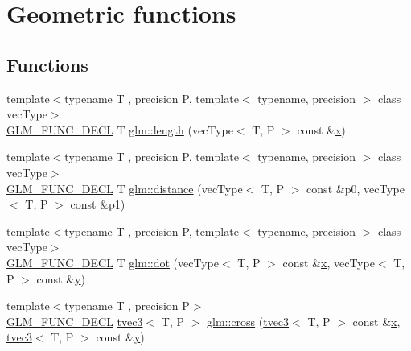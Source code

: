 \hypertarget{group__core__func__geometric}{}\section{Geometric functions}
\label{group__core__func__geometric}
\subsection*{Functions}
\begin{DoxyCompactItemize}
\item 
{\footnotesize template$<$typename T , precision P, template$<$ typename, precision $>$ class vec\+Type$>$ }\\\mbox{\hyperlink{setup_8hpp_ab2d052de21a70539923e9bcbf6e83a51}{G\+L\+M\+\_\+\+F\+U\+N\+C\+\_\+\+D\+E\+CL}} T \mbox{\hyperlink{group__core__func__geometric_ga18d45e3d4c7705e67ccfabd99e521604}{glm\+::length}} (vec\+Type$<$ T, P $>$ const \&\mbox{\hyperlink{glad_8h_a92d0386e5c19fb81ea88c9f99644ab1d}{x}})
\item 
{\footnotesize template$<$typename T , precision P, template$<$ typename, precision $>$ class vec\+Type$>$ }\\\mbox{\hyperlink{setup_8hpp_ab2d052de21a70539923e9bcbf6e83a51}{G\+L\+M\+\_\+\+F\+U\+N\+C\+\_\+\+D\+E\+CL}} T \mbox{\hyperlink{group__core__func__geometric_ga7ca317dde0d7e94d920153554d4a02a8}{glm\+::distance}} (vec\+Type$<$ T, P $>$ const \&p0, vec\+Type$<$ T, P $>$ const \&p1)
\item 
{\footnotesize template$<$typename T , precision P, template$<$ typename, precision $>$ class vec\+Type$>$ }\\\mbox{\hyperlink{setup_8hpp_ab2d052de21a70539923e9bcbf6e83a51}{G\+L\+M\+\_\+\+F\+U\+N\+C\+\_\+\+D\+E\+CL}} T \mbox{\hyperlink{group__core__func__geometric_ga7dada304da2ba7dd3376ab4f178c3f6b}{glm\+::dot}} (vec\+Type$<$ T, P $>$ const \&\mbox{\hyperlink{glad_8h_a92d0386e5c19fb81ea88c9f99644ab1d}{x}}, vec\+Type$<$ T, P $>$ const \&\mbox{\hyperlink{glad_8h_a66ddd433d2cacfe27f5906b7e86faeed}{y}})
\item 
{\footnotesize template$<$typename T , precision P$>$ }\\\mbox{\hyperlink{setup_8hpp_ab2d052de21a70539923e9bcbf6e83a51}{G\+L\+M\+\_\+\+F\+U\+N\+C\+\_\+\+D\+E\+CL}} \mbox{\hyperlink{structglm_1_1tvec3}{tvec3}}$<$ T, P $>$ \mbox{\hyperlink{group__core__func__geometric_gafe2cae8cb26fd44be62aee97369d0af8}{glm\+::cross}} (\mbox{\hyperlink{structglm_1_1tvec3}{tvec3}}$<$ T, P $>$ const \&\mbox{\hyperlink{glad_8h_a92d0386e5c19fb81ea88c9f99644ab1d}{x}}, \mbox{\hyperlink{structglm_1_1tvec3}{tvec3}}$<$ T, P $>$ const \&\mbox{\hyperlink{glad_8h_a66ddd433d2cacfe27f5906b7e86faeed}{y}})

\end{DoxyCompactItemize}
